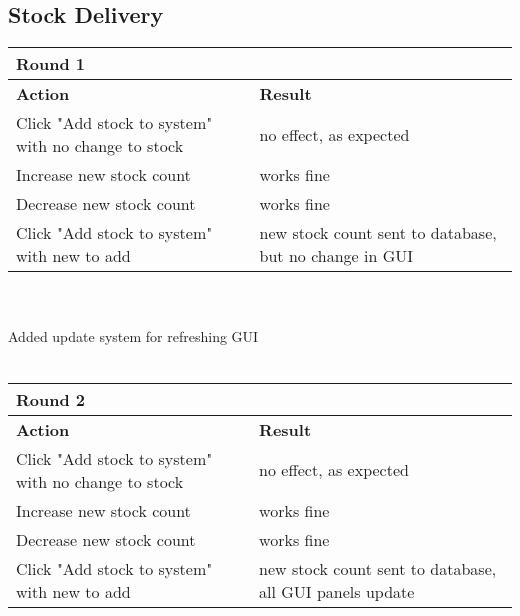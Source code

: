 \documentclass[11pt,a4paper]{article}
\begin{document}
	
	\subsection{Stock Delivery}
	\begin{tabular}{|m{7cm}|m{7cm}|}
		\hline Round 1\\
		\hline \textbf{Action} & \textbf{Result}\\
		\hline Click "Add stock to system" with no change to stock & no effect, as expected\\
		\hline Increase new stock count & works fine\\
		\hline Decrease new stock count & works fine\\
		\hline Click "Add stock to system" with new to add &\color{blue} new stock count sent to database, but no change in GUI\\
		\hline
	\end{tabular}\\ \ \\
		Added update system for refreshing GUI\\ \ \\
		\begin{tabular}{|m{7cm}|m{7cm}|}
			\hline Round 2\\
			\hline \textbf{Action} & \textbf{Result}\\
			\hline Click "Add stock to system" with no change to stock & no effect, as expected\\
			\hline Increase new stock count & works fine\\
			\hline Decrease new stock count & works fine\\
			\hline Click "Add stock to system" with new to add & new stock count sent to database, all GUI panels update\\
			\hline 
		\end{tabular}
\end{document}
